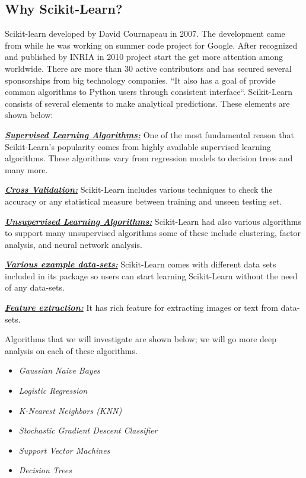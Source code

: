 \documentclass[sigconf]{acmart}
\begin{document}
\subsection{Why Scikit-Learn?}
Scikit-learn developed by David Cournapeau in 2007. The development came from while he was working on summer code project for Google. After recognized and published by INRIA in 2010 project start the get more attention among worldwide. There are more than 30 active contributors and has secured several sponsorships from big technology companies\cite{www-machinelearningmystery}. ``It also has a goal of provide common algorithms to Python users through consistent interface\cite{www-oreily}``. Scikit-Learn consists of several elements to make analytical predictions. These elements are shown below\cite{www-analyticvidhya}:


\par \textbf{\textit{\underline{Supervised Learning Algorithms:}}} One of the most fundamental reason that Scikit-Learn's popularity comes from highly available supervised learning algorithms. These algorithms vary from regression models to decision trees and many more\cite{www-analyticvidhya}. 
\par \textbf{\textit{\underline{Cross Validation:}}} Scikit-Learn includes various techniqu\-es to check the accuracy or any statistical measure between training and unseen testing set\cite{www-analyticvidhya}. 
\par \textbf{\textit{\underline{Unsupervised Learning Algorithms:}}} Scikit-Learn had al\-so various algorithms to support many unsupervised algorithms some of these include clustering, factor analysis, and neural network analysis\cite{www-analyticvidhya}. 
\par \textbf{\textit{\underline{Various example data-sets:}}} Scikit-Learn comes with different data sets included in its package so users can start learning Scikit-Learn without the need of any data-sets\cite{www-analyticvidhya}. 
\par \textbf{\textit{\underline{Feature extraction:}}} It has rich feature for extracting images or text from data-sets\cite{www-analyticvidhya}.


\par Algorithms that we will investigate are shown below; we will go more deep analysis on each of these algorithms. 

\begin{itemize}
    \item \textit{Gaussian Naive Bayes}
    \item \textit{Logistic Regression}
    \item \textit{K-Nearest Neighbors (KNN)}
    \item \textit{Stochastic Gradient Descent Classifier}
    \item \textit{Support Vector Machines}
    \item \textit{Decision Trees} 
\end{itemize}
\end{document}
